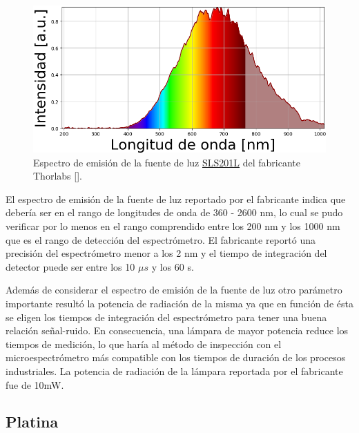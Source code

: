 \begin{figure}[H]
	\centering
	\includegraphics[width=1.0\textwidth]{Figs/microespectrometro/espfuentethorl.png}
	\caption{Espectro de emisión de la fuente de luz \href{https://www.thorlabs.com/newgrouppage9.cfm?objectgroup_id=7269&pn=SLS201L/M}{SLS201L} del fabricante Thorlabs [\href{https://github.com/jrr1984/defects_analysis/blob/master/light_sources_spectrum.py}{\faGithub}].}
	\label{fig:espfth}
\end{figure}

El espectro de emisión de la fuente de luz reportado por el fabricante indica que debería ser en el rango de longitudes de onda de 360 - 2600 nm, lo cual se pudo verificar por lo menos en el rango comprendido entre los 200 nm y los 1000 nm que es el rango de detección del espectrómetro. El fabricante reportó una precisión del espectrómetro menor a los 2 nm y el tiempo de integración del detector puede ser entre los 10 $\mu s$ y los 60 s.

Además de considerar el espectro de emisión de la fuente de luz otro parámetro importante resultó la potencia de radiación de la misma ya que en función de ésta se eligen los tiempos de integración del espectrómetro para tener una buena relación señal-ruido. En consecuencia, una lámpara de mayor potencia reduce los tiempos de medición, lo que haría al método de inspección con el microespectrómetro más compatible con los tiempos de duración de los procesos industriales. La potencia de radiación de la lámpara reportada por el fabricante fue de 10mW. 

\singlespacing
\subsection{Platina \href{https://github.com/jrr1984/open\_frame\_XYStage}{\faGithub}}
\label{sec:platina}

